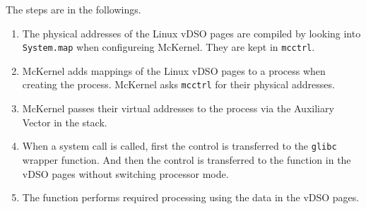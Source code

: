 \documentclass[twoside,11pt,fleqn]{book}
\begin{document}
The steps are in the followings.
\begin{enumerate}
\item The physical addresses of the Linux vDSO pages are compiled by looking into \texttt{System.map} when configureing McKernel. They are kept in \texttt{mcctrl}.
\item McKernel adds mappings of the Linux vDSO pages to a process when creating the process. McKernel asks \texttt{mcctrl} for their physical addresses. 
\item McKernel passes their virtual addresses to the process via the Auxiliary Vector in the stack.
\item When a system call is called, first the control is transferred to the \texttt{glibc} wrapper function. And then the control is transferred to the function in the vDSO pages without switching processor mode.
\item The function performs required processing using the data in the vDSO pages.
\end{enumerate}

\end{document}
